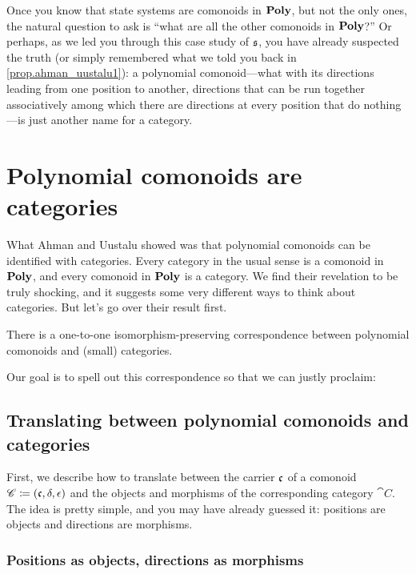 \documentclass[Book-Poly]{subfiles}
\begin{document}
Once you know that state systems are comonoids in $\mathbf{Poly}$, but not the only ones, the natural question to ask is ``what are all the other comonoids in $\mathbf{Poly}$?''
Or perhaps, as we led you through this case study of $\mathfrak{s}$, you have already suspected the truth (or simply remembered what we told you back in \cref{prop.ahman_uustalu1}): a polynomial comonoid---what with its directions leading from one position to another, directions that can be run together associatively among which there are directions at every position that do nothing---is just another name for a category.

\section{Polynomial comonoids are categories}

What Ahman and Uustalu showed was that polynomial comonoids can be identified with categories.
Every category in the usual sense is a comonoid in $\mathbf{Poly}$, and every comonoid in $\mathbf{Poly}$ is a category. 
We find their revelation to be truly shocking, and it suggests some very different ways to think about categories.
But let's go over their result first.

\begin{theorem}\label{thm.ahman_uustalu}
There is a one-to-one isomorphism-preserving correspondence between polynomial comonoids and (small) categories.
\end{theorem}

Our goal is to spell out this correspondence so that we can justly proclaim:


\subsection{Translating between polynomial comonoids and categories}

First, we describe how to translate between the carrier $\mathfrak{c}$ of a comonoid $\mathscr{C}\coloneqq(\mathfrak{c},\delta,\epsilon)$ and the objects and morphisms of the corresponding category $\cat{C}$.
The idea is pretty simple, and you may have already guessed it: positions are objects and directions are morphisms.

\subsubsection{Positions as objects, directions as morphisms}
\end{document}
